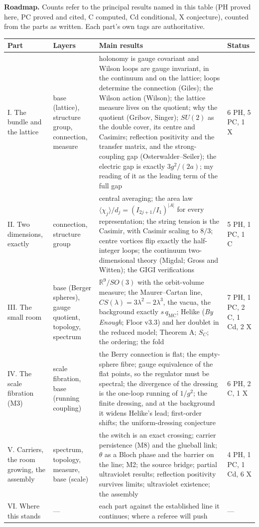 \textbf{Roadmap.} Counts refer to the principal results named in this table
(PH proved here, PC proved and cited, C computed, Cd conditional, X
conjecture), counted from the parts as written. Each part's own tags are
authoritative.
\begin{center}\small
\begin{tabular}{@{}p{0.55in}p{1.25in}p{3.45in}p{0.95in}@{}}\toprule
\textbf{Part} & \textbf{Layers} & \textbf{Main results} & \textbf{Status}\\\midrule
I. The bundle and the lattice & base (lattice), structure group, connection, measure & holonomy is gauge covariant and Wilson loops are gauge invariant, in the continuum and on the lattice; loops determine the connection (Giles); the Wilson action (Wilson); the lattice measure lives on the quotient; why the quotient (Gribov, Singer); $SU(2)$ as the double cover, its centre and Casimirs; reflection positivity and the transfer matrix, and the strong-coupling gap (Osterwalder--Seiler); the electric gap is exactly $3g^2/(2a)$; my reading of it as the leading term of the full gap & 6 PH, 5 PC, 1 X\\[4pt]
II. Two dimensions, exactly & connection, structure group & central averaging; the area law $\langle\chi_j\rangle/d_j=(I_{2j+1}/I_1)^{|A|}$ for every representation; the string tension is the Casimir, with Casimir scaling to $8/3$; centre vortices flip exactly the half-integer loops; the continuum two-dimensional theory (Migdal; Gross and Witten); the GIGI verifications & 5 PH, 1 PC, 1 C\\[4pt]
III. The small room & base (Berger spheres), gauge quotient, topology, spectrum & $\mathbb R^9/SO(3)$ with the orbit-volume measure; the Maurer--Cartan line, $CS(\lambda)=3\lambda^2-2\lambda^3$, the vacua, the background exactly $s\,q_{\mathrm{MC}}$; Helike (\emph{By Enough}; Floor v3.3) and her doublet in the reduced model; Theorem A; $S_C$; the ordering; the fold & 7 PH, 1 PC, 2 C, 1 Cd, 2 X\\[4pt]
IV. The scale fibration (M3) & scale fibration, base (running coupling) & the Berry connection is flat; the empty-sphere fibre; gauge equivalence of the flat points, so the regulator must be spectral; the divergence of the dressing is the one-loop running of $1/g^2$; the finite dressing, and at the background it widens Helike's lead; first-order shifts; the uniform-dressing conjecture & 6 PH, 2 C, 1 X\\[4pt]
V. Carriers, the room growing, the assembly & spectrum, topology, measure, base (scale) & the switch is an exact crossing; carrier persistence (M8) and the glueball link; $\theta$ as a Bloch phase and the barrier on the line; M2; the source bridge; partial ultraviolet results; reflection positivity survives limits; ultraviolet existence; the assembly & 4 PH, 1 PC, 1 Cd, 6 X\\[4pt]
VI. Where this stands & --- & each part against the established line it continues; where a referee will push & ---\\\bottomrule
\end{tabular}
\end{center}


